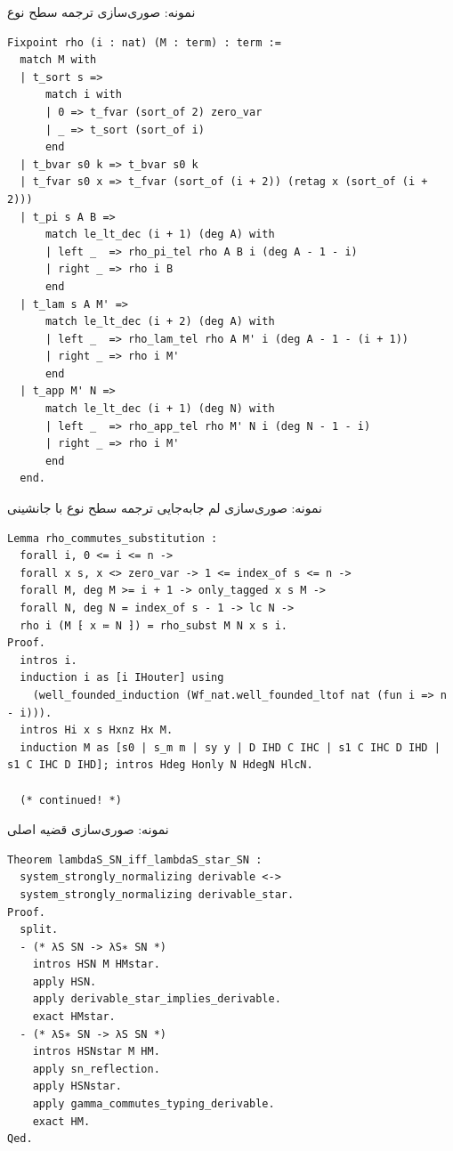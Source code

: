 \documentclass[12pt, aspectratio=169]{beamer}
\begin{document}
\begin{frame}[fragile]{نمونه‌: صوری‌سازی ترجمه سطح نوع}
\begin{latin}
\setmonofont{DejaVu Sans Mono}
\begin{verbatim}
Fixpoint rho (i : nat) (M : term) : term :=
  match M with
  | t_sort s =>
      match i with
      | 0 => t_fvar (sort_of 2) zero_var
      | _ => t_sort (sort_of i)
      end
  | t_bvar s0 k => t_bvar s0 k
  | t_fvar s0 x => t_fvar (sort_of (i + 2)) (retag x (sort_of (i + 2)))
  | t_pi s A B =>
      match le_lt_dec (i + 1) (deg A) with
      | left _  => rho_pi_tel rho A B i (deg A - 1 - i)
      | right _ => rho i B
      end
  | t_lam s A M' =>
      match le_lt_dec (i + 2) (deg A) with
      | left _  => rho_lam_tel rho A M' i (deg A - 1 - (i + 1))
      | right _ => rho i M'
      end
  | t_app M' N =>
      match le_lt_dec (i + 1) (deg N) with
      | left _  => rho_app_tel rho M' N i (deg N - 1 - i)
      | right _ => rho i M'
      end
  end.
\end{verbatim}
\end{latin}
\end{frame}

\begin{frame}[fragile]{نمونه‌: صوری‌سازی لم جابه‌جایی ترجمه سطح نوع با جانشینی}
\begin{latin}
\setmonofont{DejaVu Sans Mono}
\begin{verbatim}
Lemma rho_commutes_substitution :
  forall i, 0 <= i <= n ->
  forall x s, x <> zero_var -> 1 <= index_of s <= n ->
  forall M, deg M >= i + 1 -> only_tagged x s M ->
  forall N, deg N = index_of s - 1 -> lc N ->
  rho i (M ⁅ x ≔ N ⁆) = rho_subst M N x s i.
Proof.
  intros i.
  induction i as [i IHouter] using
    (well_founded_induction (Wf_nat.well_founded_ltof nat (fun i => n - i))).
  intros Hi x s Hxnz Hx M.
  induction M as [s0 | s_m m | sy y | D IHD C IHC | s1 C IHC D IHD | s1 C IHC D IHD]; intros Hdeg Honly N HdegN HlcN.

  (* continued! *)
\end{verbatim}
\end{latin}
\end{frame}

\begin{frame}[fragile]{نمونه‌: صوری‌سازی قضیه اصلی}
\begin{latin}
\setmonofont{DejaVu Sans Mono}
\begin{verbatim}
Theorem lambdaS_SN_iff_lambdaS_star_SN :
  system_strongly_normalizing derivable <-> 
  system_strongly_normalizing derivable_star.
Proof.
  split.
  - (* λS SN -> λS∗ SN *)
    intros HSN M HMstar.
    apply HSN.
    apply derivable_star_implies_derivable.
    exact HMstar.
  - (* λS∗ SN -> λS SN *)
    intros HSNstar M HM.
    apply sn_reflection.
    apply HSNstar.
    apply gamma_commutes_typing_derivable.
    exact HM.
Qed.
\end{verbatim}
\end{latin}
\end{frame}
\end{document}
